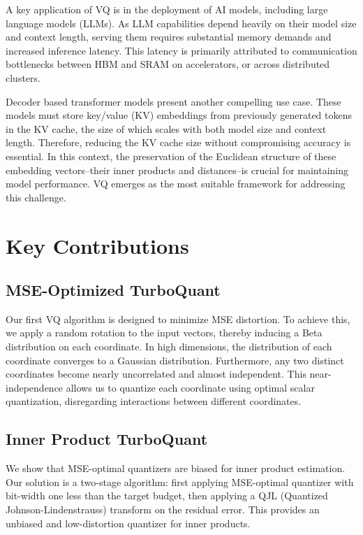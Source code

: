 \documentclass[11pt]{article}
\begin{document}
A key application of VQ is in the deployment of AI models, including large language models (LLMs). As LLM capabilities depend heavily on their model size and context length, serving them requires substantial memory demands and increased inference latency. This latency is primarily attributed to communication bottlenecks between HBM and SRAM on accelerators, or across distributed clusters.

Decoder based transformer models present another compelling use case. These models must store key/value (KV) embeddings from previously generated tokens in the KV cache, the size of which scales with both model size and context length. Therefore, reducing the KV cache size without compromising accuracy is essential. In this context, the preservation of the Euclidean structure of these embedding vectors--their inner products and distances--is crucial for maintaining model performance. VQ emerges as the most suitable framework for addressing this challenge.

\section{Key Contributions}

\subsection{MSE-Optimized TurboQuant}
Our first VQ algorithm is designed to minimize MSE distortion. To achieve this, we apply a random rotation to the input vectors, thereby inducing a Beta distribution on each coordinate. In high dimensions, the distribution of each coordinate converges to a Gaussian distribution. Furthermore, any two distinct coordinates become nearly uncorrelated and almost independent. This near-independence allows us to quantize each coordinate using optimal scalar quantization, disregarding interactions between different coordinates.

\subsection{Inner Product TurboQuant}
We show that MSE-optimal quantizers are biased for inner product estimation. Our solution is a two-stage algorithm: first applying MSE-optimal quantizer with bit-width one less than the target budget, then applying a QJL (Quantized Johnson-Lindenstrauss) transform on the residual error. This provides an unbiased and low-distortion quantizer for inner products.
\end{document}

